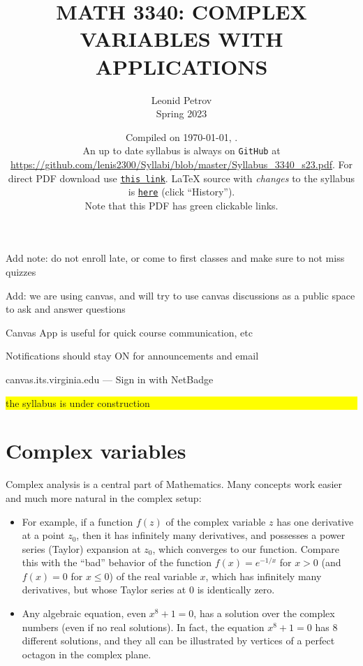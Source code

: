 \documentclass[oneside,11pt]{amsart}
\begin{document}
Add note: do not enroll late, or come to first classes and make sure to not miss quizzes

Add: we are using canvas, and will try to use canvas discussions as a public space to ask and answer questions

Canvas App is useful for quick course communication, etc

Notifications should stay ON for announcements and email

canvas.its.virginia.edu --- Sign in with NetBadge


\colorbox{yellow}{\parbox{.7\textwidth}{the syllabus is under construction}}

\title[MATH 3340: COMPLEX VARIABLES WITH APPLICATIONS]{MATH 3340: COMPLEX VARIABLES WITH APPLICATIONS}
\author{Leonid Petrov\\Spring 2023}
\date{Compiled on \today, \currenttime{}.\\An up to date syllabus is always on \texttt{GitHub} at \url{https://github.com/lenis2300/Syllabi/blob/master/Syllabus_3340_s23.pdf}. For direct PDF download use \href{https://github.com/lenis2300/Syllabi/raw/master/Syllabus_3340_s23.pdf}{\texttt{this link}}.
	\LaTeX{} source with \textit{changes} to the syllabus is \href{https://github.com/lenis2300/Syllabi/blob/master/Syllabus_3340_s23.tex}{\texttt{here}}
(click ``History'').
\\Note that this PDF has green clickable links.}
\maketitle

\section{Complex variables}

Complex analysis is a central part of 
Mathematics. Many concepts work easier and much more natural
in the complex setup:
\begin{itemize}
	\item 
For example, if a function $f(z)$ 
of the complex variable $z$
has one 
derivative at a point $z_0$, then it has infinitely many derivatives,
and possesses a power series (Taylor) expansion at $z_0$, which converges to our function. 
Compare this with the “bad” behavior of the function 
$f(x)=e^{-1/x}$ for $x>0$ (and $f(x)=0$ for $x\le 0$) of the real variable $x$,
which has infinitely many derivatives, but whose Taylor series at $0$ is 
identically zero.
\item Any algebraic equation, even $x^{8}+1=0$,
	has a solution over the complex numbers (even
	if no real solutions). In fact, 
	the equation $x^{8}+1=0$ has $8$ different
	solutions, and they all can be illustrated by vertices of a perfect octagon
	in the complex plane.
\end{itemize}
\end{document}
